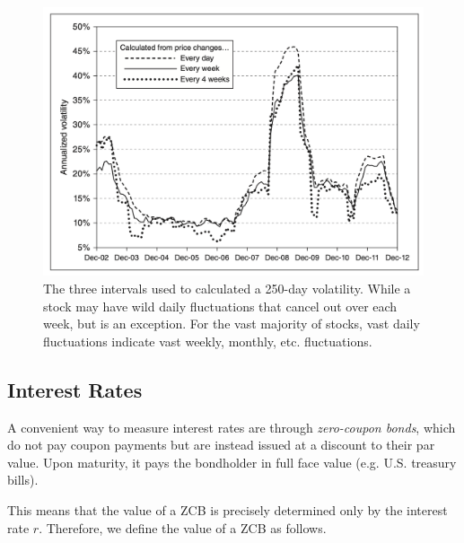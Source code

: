 \documentclass{article}
\begin{document}
    \begin{figure}[H]
      \centering 
      \includegraphics[scale=0.4]{img/vol_time_periods.png}
      \caption{The three intervals used to calculated a 250-day volatility. While a stock may have wild daily fluctuations that cancel out over each week, but is an exception. For the vast majority of stocks, vast daily fluctuations indicate vast weekly, monthly, etc. fluctuations. } 
      \label{fig:vol_with_time}
    \end{figure}
  
  \subsection{Interest Rates}

    \begin{definition}
      A convenient way to measure interest rates are through \textit{zero-coupon bonds}, which do not pay coupon payments but are instead issued at a discount to their par value. Upon maturity, it pays the bondholder in full face value (e.g. U.S. treasury bills). 
    \end{definition}

    This means that the value of a ZCB is precisely determined only by the interest rate $r$. Therefore, we define the value of a ZCB as follows. 
\end{document}
